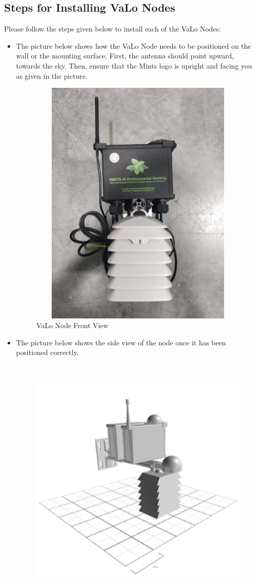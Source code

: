 \documentclass[12pt]{article}
\begin{document}
\subsection{Steps for Installing VaLo Nodes}
Please follow the steps given below to install each of the VaLo Nodes:
\begin{itemize}
\item The picture below shows how the VaLo Node needs to be positioned on the wall or the mounting surface. First, the antenna should point upward, towards the sky. Then, ensure that the Mints logo is upright and facing you as given in the picture.
 \begin{figure}[H]
     \centering
     \includegraphics[width=12cm,height=12cm,]{figures/VaLo_1.png}
     \centering
    \caption{VaLo Node Front View}\label{Fig:VaLo Node_1}
\end{figure}
\item The picture below shows the side view of the node once it has been positioned correctly.
 \begin{figure}[H]
     \centering
     \includegraphics[width=12cm,height=12cm,]{figures/VaLo_2.png}

\end{figure}
\end{itemize}
\end{document}

